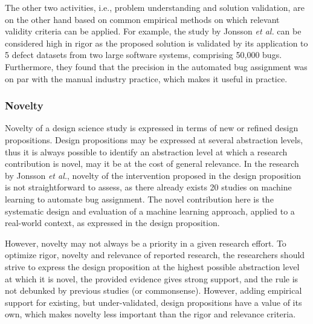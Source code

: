 \documentclass[graybox]{svmult}
\begin{document}
The other two activities, i.e., problem understanding and solution validation, are on the other hand based on common empirical methods on which relevant validity criteria can be applied. For example, the study by Jonsson \emph{et al.} can be considered high in rigor as the proposed solution is validated by its application to 5 defect datasets from two large software systems, comprising 50,000 bugs.  Furthermore, they found that the precision in the automated bug assignment was on par with the manual industry practice, which makes it useful in practice.

\subsubsection{Novelty %
} 
Novelty of a design science study is expressed in terms of new or refined design propositions. Design propositions may be expressed at several abstraction levels, thus it is always possible to identify an abstraction level at which a research contribution is novel, may it be at the cost of general relevance.  In the research by Jonsson \emph{et al.}, novelty of the intervention proposed in the design proposition is not straightforward to assess, as there already exists 20 studies on machine learning to automate bug assignment. The novel contribution here is the systematic design and evaluation of a machine learning approach, applied to a real-world context, as expressed in the design proposition.

However, novelty may not always be a priority in a given research effort.
To optimize rigor, novelty and relevance of reported research, the researchers should strive to express the design proposition at the highest possible abstraction level at which it is novel, the provided evidence gives strong support, and the rule is not debunked by previous studies (or commonsense). However, adding empirical support for existing, but under-validated, design propositions have a value of its own, which makes novelty less important than the rigor and relevance criteria.
\end{document}
